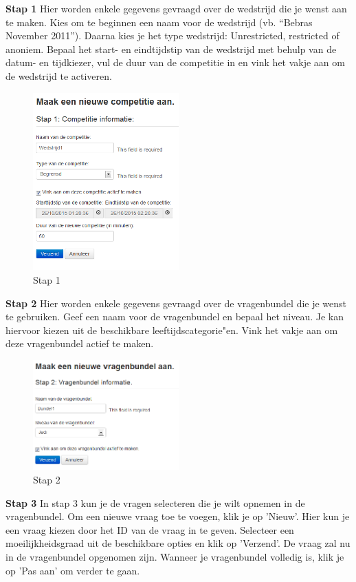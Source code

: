 \documentclass[]{article}
\begin{document}
\textbf{Stap 1}
Hier worden enkele gegevens gevraagd over de wedstrijd die je wenst aan te maken. 
Kies om te beginnen een naam voor de wedstrijd (vb. "`Bebras November 2011"'). Daarna kies je het type wedstrijd: Unrestricted, restricted of anoniem. Bepaal het start- en eindtijdstip van de wedstrijd met behulp van de datum- en tijdkiezer, vul de duur van de competitie in en vink het vakje aan om de wedstrijd te activeren.

\begin{figure}[!ht]
	\centering
	\includegraphics[width=0.5\textwidth]{img/stap1}
	\caption{Stap 1}
	\label{stap1}
\end{figure}

\textbf{Stap 2}
Hier worden enkele gegevens gevraagd over de vragenbundel die je wenst te gebruiken. 
Geef een naam voor de vragenbundel en bepaal het niveau. Je kan hiervoor kiezen uit de beschikbare leeftijdscategorie"en. Vink het vakje aan om deze vragenbundel actief te maken.

\begin{figure}[!ht]
	\centering
	\includegraphics[width=0.5\textwidth]{img/stap2}
	\caption{Stap 2}
	\label{stap2}
\end{figure}

\textbf{Stap 3}
In stap 3 kun je de vragen selecteren die je wilt opnemen in de vragenbundel. Om een nieuwe vraag toe te voegen, klik je op 'Nieuw'. Hier kun je een vraag kiezen door het ID van de vraag in te geven. Selecteer een moeilijkheidsgraad uit de beschikbare opties en klik op 'Verzend'. De vraag zal nu in de vragenbundel opgenomen zijn. Wanneer je vragenbundel volledig is, klik je op 'Pas aan' om verder te gaan.
\end{document}
